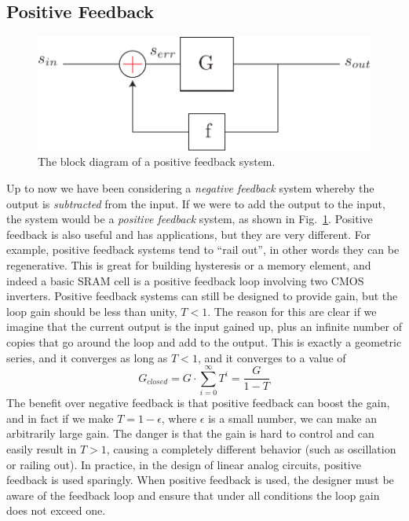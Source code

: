 \subsection{Positive Feedback}
\begin{figure}[tb]
\centering
\includegraphics[scale=.7]{fbblock_posfb}
\caption{The block diagram of a positive feedback system.}
\label{fig:fbblock_posfb}
\end{figure}
Up to now we have been considering a \textit{negative feedback} system whereby the output is \textit{subtracted} from the input. If we were to add the output to the input, the system would be a \textit{positive feedback} system, as shown in Fig.~\ref{fig:fbblock_posfb}.  Positive feedback is also useful and has applications, but they are very different.  For example, positive feedback systems tend to “rail out”, in other words they can be regenerative.  This is great for building hysteresis or a memory element, and indeed a basic SRAM cell is a positive feedback loop involving two CMOS inverters.  Positive feedback systems can still be designed to provide gain, but the loop gain should be less than unity, $T < 1$.  The reason for this are clear if we imagine that the current output is the input gained up, plus an infinite number of copies that go around the loop and add to the output.  This is exactly a geometric series, and it converges as long as $T< 1$, and it converges to a value of
    \begin{equation}
        G_{closed} = G \cdot \sum_{i=0}^\infty T^i = \frac{G}{1 - T}
    \end{equation}
The benefit over negative feedback is that positive feedback can boost the gain, and in fact if we make $T = 1 - \epsilon$, where $\epsilon$ is a small number, we can make an arbitrarily large gain.  The danger is that the gain is hard to control and can easily result in $T> 1$, causing a completely different behavior (such as oscillation or railing out).  In practice, in the design of linear analog circuits, positive feedback is used sparingly.  When positive feedback is used, the designer must be aware of the feedback loop and ensure that under all conditions the loop gain does not exceed one.
